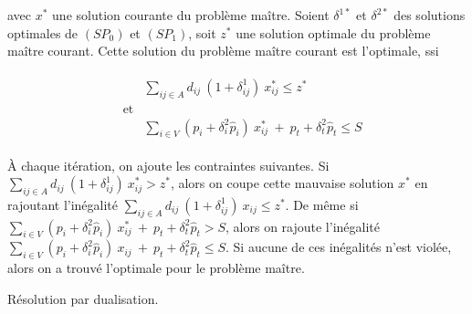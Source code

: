 \documentclass[11pt,a4paper]{exam}
\begin{document}
\begin{questions}
avec $x^{*}$ une solution courante du problème maître. Soient $\delta^{1*}$ et $\delta^{2*}$ des solutions optimales de $\left(SP_{0}\right)$ et $\left(SP_{1}\right)$, soit $z^{*}$ une solution optimale du problème maître courant. Cette solution du problème maître courant est l'optimale, ssi 

\begin{align*}
\begin{array}{lll}
	& &\sum\limits_{ij \in A} d_{ij} \ (1 + \delta^{1}_{ij}) \ x^{*}_{ij} \leq z^{*}\\
	&\text{et}\\
	& &\sum\limits_{i \in V} (p_{i} + \delta^{2}_{i} \hat{p}_{i}) \ x^{*}_{ij}\ +\ p_{t} + \delta^{2}_{t} \hat{p}_{t} \leq S
\end{array}
\end{align*}

À chaque itération, on ajoute les contraintes suivantes. Si $\sum\limits_{ij \in A} d_{ij} \ (1 + \delta^{1}_{ij}) \ x^{*}_{ij} > z^{*}$, alors on coupe cette mauvaise solution $x^{*}$ en rajoutant l'inégalité $\sum\limits_{ij \in A} d_{ij} \ (1 + \delta^{1}_{ij}) \ x_{ij} \leq z^{*}$. De même si $\sum\limits_{i \in V} (p_{i} + \delta^{2}_{i} \hat{p}_{i}) \ x^{*}_{ij}\ +\ p_{t} + \delta^{2}_{t} \hat{p}_{t} > S$, alors on rajoute l'inégalité $\sum\limits_{i \in V} (p_{i} + \delta^{2}_{i} \hat{p}_{i}) \ x_{ij}\ +\ p_{t} + \delta^{2}_{t} \hat{p}_{t} \leq S$. Si aucune de ces inégalités n'est violée, alors on a trouvé l'optimale pour le problème maître.

\question Résolution par dualisation.


\end{questions}
\end{document}
